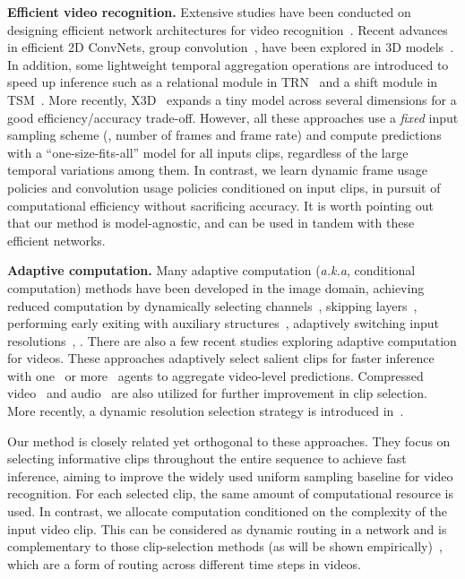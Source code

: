 \documentclass[final]{cvpr}
\makeatletter
\newcommand*{\aka}{\emph{a.k.a}\@\xspace}
\makeatother
\begin{document}
\vspace{0.05in}
\noindent\textbf{Efficient video recognition.} Extensive studies have been conducted on designing efficient network architectures for video recognition~\cite{eco,multifiber,r21d,x3d,trn,tsm,channelseparated}. Recent advances in efficient 2D ConvNets, \eg group convolution~\cite{mobilenets,mobilenetv2}, have been explored in 3D models~\cite{multifiber,r21d, channelseparated}. In addition, some lightweight temporal aggregation operations are introduced to speed up inference such as a relational module in TRN~\cite{trn} and a shift module in TSM~\cite{tsm}. More recently, X3D~\cite{x3d} expands a tiny model across several dimensions for a good efficiency/accuracy trade-off. However, all these approaches use a \emph{fixed}
input sampling scheme (\ie, number of frames and frame rate) and compute predictions with a ``one-size-fits-all'' model for all inputs clips, regardless of the large  temporal variations among them. In contrast, we learn dynamic frame usage policies and convolution usage policies conditioned on input clips, in pursuit of computational efficiency without sacrificing accuracy. It is worth pointing out that our method is model-agnostic, and can be used in tandem with these efficient networks. 

\vspace{0.05in}
\noindent\textbf{Adaptive computation.} Many adaptive computation (\aka, conditional computation) methods have been developed in the image domain, achieving reduced computation by dynamically selecting channels~\cite{channelgated,runtime}, skipping layers~\cite{blockdrop,figurnov,skipnet,andreasadaptive}, performing early exiting with auxiliary structures~\cite{huanggaoimproved,multiscale_densenet,icmladaptive,huanggaoresolution}, adaptively switching input resolutions~\cite{autofocus,whenandwhere,huanggaoresolution}, \etc. There are also a few recent studies exploring adaptive computation for videos. These approaches adaptively select salient clips for faster inference with one~\cite{adaframe} or more~\cite{marl} agents to aggregate video-level predictions. Compressed video~\cite{scsampler} and audio~\cite{listentolook,scsampler} are also utilized for further improvement in clip selection. More recently, a dynamic resolution selection strategy is introduced in~\cite{arnet}. 

Our method is closely related yet orthogonal to these approaches. They focus on selecting informative clips throughout the entire sequence to achieve fast inference, aiming to improve the widely used uniform sampling baseline for video recognition. For each selected clip, the same amount of computational resource is used. In contrast, we allocate computation conditioned on the complexity of the input video clip. This can be considered as dynamic routing in a network and is complementary to those clip-selection methods (as will be shown empirically)~\cite{adaframe,listentolook,scsampler}, which are a form of routing across different time steps in videos. 
 
\end{document}
